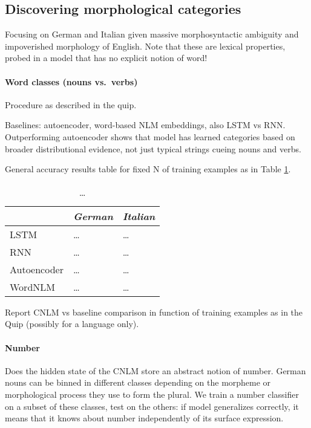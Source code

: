 \subsection{Discovering morphological categories}
\label{sec:categories}

Focusing on German and Italian given massive morphosyntactic ambiguity
and impoverished morphology of English. Note that these are lexical
properties, probed in a model that has no explicit notion of word!

\paragraph{Word classes (nouns vs.~verbs)}

Procedure as described in the quip.

Baselines: autoencoder, word-based NLM embeddings, also LSTM vs
RNN. Outperforming autoencoder shows that model has learned categories
based on broader distributional evidence, not just typical strings
cueing nouns and verbs.

General accuracy results table for fixed N of training examples as in Table \ref{tab:pos-results}.

\begin{table}[t]
  \begin{center}
    \begin{tabular}{l|l|l}
      \multicolumn{1}{c}{}&\emph{German}&\emph{Italian}\\
      \hline
      LSTM&\ldots&\ldots\\
      RNN&\ldots&\ldots\\
      Autoencoder&\ldots&\ldots\\
      WordNLM&\ldots&\ldots\\
    \end{tabular}
  \end{center}
  \caption{\label{tab:pos-results} \ldots}
\end{table}

Report CNLM vs baseline comparison in function of training examples as in the Quip (possibly for a language only).

\paragraph{Number}

Does the hidden state of the CNLM store an abstract notion of
number. German nouns can be binned in different classes depending on
the morpheme or morphological process they use to form the plural. We
train a number classifier on a subset of these classes, test on the
others: if model generalizes correctly, it means that it knows about
number independently of its surface expression.

